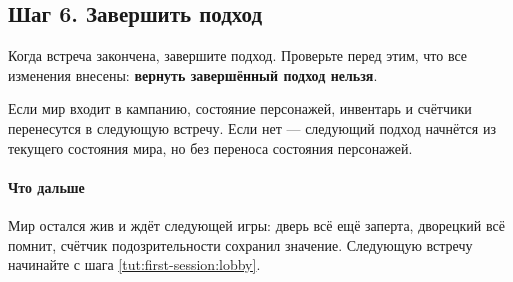 \subsection{Шаг 6. Завершить подход}\label{tut:first-session:finish}

Когда встреча закончена, завершите подход. Проверьте перед этим, что все изменения внесены: \textbf{вернуть завершённый подход нельзя}.

Если мир входит в кампанию, состояние персонажей, инвентарь и счётчики перенесутся в следующую встречу. Если нет --- следующий подход начнётся из текущего состояния мира, но без переноса состояния персонажей.

\paragraph{Что дальше}
Мир остался жив и ждёт следующей игры: дверь всё ещё заперта, дворецкий всё помнит, счётчик подозрительности сохранил значение. Следующую встречу начинайте с шага \ref{tut:first-session:lobby}.
